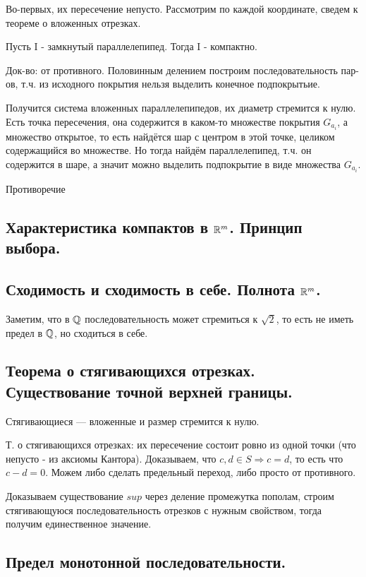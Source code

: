 \documentclass[12pt, a4paper]{article}
\begin{document}
Во-первых, их пересечение непусто. 
Рассмотрим по каждой координате, 
сведем к теореме о вложенных отрезках. 

Пусть I - замкнутый параллелепипед. Тогда I - компактно.

Док-во: от противного.
Половинным делением построим последовательность пар-ов, т.ч.
из исходного покрытия нельзя выделить конечное подпокрытьие.

Получится система вложенных параллелепипедов, их диаметр стремится к нулю.
Есть точка пересечения, она содержится в каком-то множестве покрытия $G_{a_i}$, 
а множество открытое, то есть найдётся шар с центром в этой точке, целиком содержащийся во множестве.
Но тогда найдём параллелепипед, т.ч. он содержится в шаре, 
а значит можно выделить подпокрытие в виде множества $G_{a_i}$.

Противоречие

\subsection{Характеристика компактов в ${\mathbb{R}}^m$. Принцип выбора.}

\subsection{Сходимость и сходимость в себе. Полнота ${\mathbb{R}}^m$.}

Заметим, что в ${\mathbb{Q}}$ последовательность может стремиться к $\sqrt{2}$, 
то есть не иметь предел в ${\mathbb{Q}}$, но сходиться в себе.

\subsection{Теорема о стягивающихся отрезках. Существование точной верхней границы.}

Стягивающиеся — вложенные и размер стремится к нулю.

Т. о стягивающихся отрезках: их пересечение состоит ровно из одной точки (что непусто - из аксиомы Кантора).
Доказываем, что $c, d \in S \Rightarrow c = d$, то есть что $c - d = 0$.
Можем либо сделать предельный переход, либо просто от противного.


Доказываем существование $sup$ через деление промежутка пополам, строим 
стягивающуюся последовательность отрезков с нужным свойством, 
тогда получим единественное значение.


\subsection{Предел монотонной последовательности.}
\end{document}
